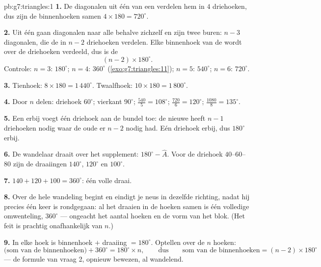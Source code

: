 \begin{solution}{pb:g7:triangles:1}
\textbf{1.} De diagonalen uit één  van een  verdelen hem in $4$
driehoeken, dus zijn de binnenhoeken samen $4 \times 180 = 720^\circ$.

\textbf{2.} Uit één  gaan diagonalen naar alle  behalve zichzelf
en zijn twee buren: $n - 3$ diagonalen, die de  in $n - 2$ driehoeken
verdelen. Elke binnenhoek van de  wordt over de driehoeken verdeeld, dus is
de 
\[
(n - 2) \times 180^\circ .
\]
Controle: $n = 3$: $180^\circ$; $n = 4$: $360^\circ$
(\cref{exo:g7:triangles:11}); $n = 5$: $540^\circ$; $n = 6$: $720^\circ$.

\textbf{3.} Tienhoek: $8 \times 180 = 1\,440^\circ$. Twaalfhoek:
$10 \times 180 = 1\,800^\circ$.

\textbf{4.} Door $n$ delen: driehoek $60^\circ$; vierkant $90^\circ$; 
$\frac{540}{5} = 108^\circ$;  $\frac{720}{6} = 120^\circ$; 
$\frac{1080}{8} = 135^\circ$.

\textbf{5.} Een  erbij voegt één driehoek aan de bundel toe: de nieuwe
 heeft $n - 1$ driehoeken nodig waar de oude er $n - 2$ nodig had. Eén
driehoek erbij, dus $180^\circ$ erbij.

\textbf{6.} De wandelaar draait over het supplement: $180^\circ - \widehat A$. Voor
de driehoek $40$--$60$--$80$ zijn de draaiingen $140^\circ$, $120^\circ$ en
$100^\circ$.

\textbf{7.} $140 + 120 + 100 = 360^\circ$: één volle draai.

\textbf{8.} Over de hele wandeling begint en eindigt je neus in dezelfde richting,
nadat hij precies één keer is rondgegaan: al het draaien in de hoeken samen is één
volledige omwenteling, $360^\circ$ --- ongeacht het aantal hoeken en de vorm van het
blok. (Het feit is prachtig onafhankelijk van $n$.)

\textbf{9.} In elke hoek is binnenhoek $+$ draaiing $= 180^\circ$. Optellen over de
$n$ hoeken:
\[
\text{(som van de binnenhoeken)} + 360^\circ = 180^\circ \times n,
\qquad\text{dus}\qquad
\text{som van de binnenhoeken} = (n - 2) \times 180^\circ
\]
--- de formule van vraag 2, opnieuw bewezen, al wandelend.


\end{solution}
